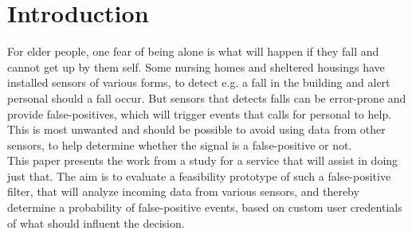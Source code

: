 \section{Introduction}

For elder people, one fear of being alone is what will happen if they fall and cannot get up by them self\cite{bell2000characteristics}.
Some nursing homes and sheltered housings have installed sensors of various forms\cite{Tun-Loft}, to detect e.g. a fall in the building and alert personal should a fall occur. 
But sensors that detects falls can be error-prone\cite{bardram2008context} and provide false-positives, which will trigger events that calls for personal to help.
This is most unwanted and should be possible to avoid using data from other sensors, to help determine whether the signal is a false-positive or not.
\\
This paper presents the work from a study for a service that will assist in doing just that.
The aim is to evaluate a feasibility prototype of such a false-positive filter, that will analyze incoming data from various sensors, and thereby determine a probability of false-positive events, based on custom user credentials of what should influent the decision.


